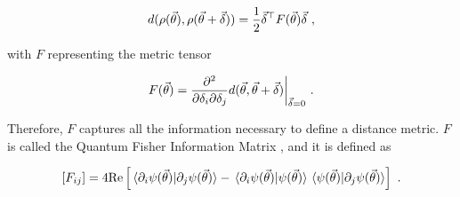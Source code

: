 \begin{equation}
    d(\rho(\vec{\theta}), \rho(\vec{\theta}+\vec{\delta})) = \frac{1}{2} \vec{\delta}^\top F(\vec{\theta})\vec{\delta}~,
\end{equation}

with \(F\) representing the metric tensor

\begin{equation}
    F(\vec{\theta}) = \frac{\partial^2}{\partial\delta_i\partial\delta_j} d(\vec{\theta}, \vec{\theta} + \vec{\delta}) \bigg\vert_{\vec{\delta} = 0}~.
\end{equation}

Therefore, \(F\) captures all the information necessary to define a distance
metric. \(F\) is called the Quantum Fisher Information Matrix
\cite{meyer2021fisher}, and it is defined as

\begin{equation}
    \left[F_{ij}\right] = 4\text{Re} \left[\braket*{\partial_i\psi(\vec{\theta})}{\partial_j\psi(\vec{\theta})} - \braket*{\partial_i\psi(\vec{\theta})}{\psi(\vec{\theta})}\braket*{\psi(\vec{\theta})}{\partial_j\psi(\vec{\theta})}\right]~.
\end{equation}
